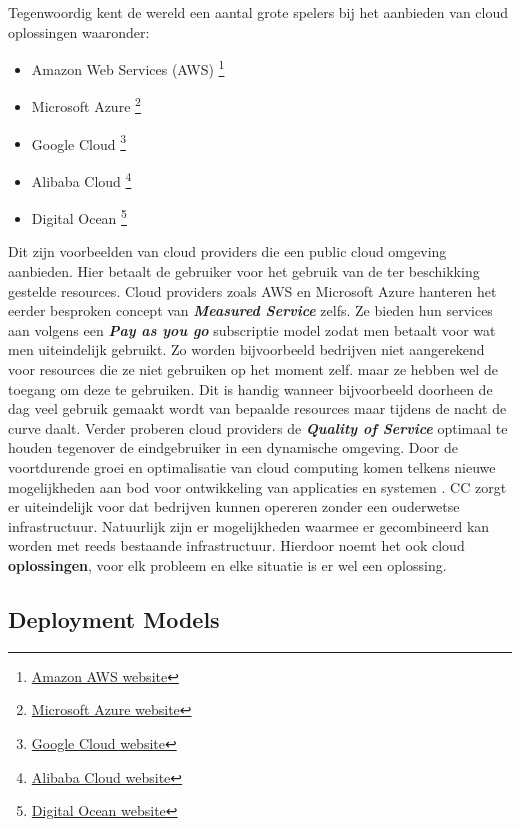 Tegenwoordig kent de wereld een aantal grote spelers bij het aanbieden van cloud oplossingen waaronder:

\begin{itemize}
    \item Amazon Web Services (AWS) \footnote{\href{https://aws.amazon.com/}{Amazon AWS website}}
    \item Microsoft Azure \footnote{\href{https://azure.microsoft.com/nl-nl/}{Microsoft Azure website}}
    \item Google Cloud \footnote{\href{https://cloud.google.com/}{Google Cloud website}}
    \item Alibaba Cloud \footnote{\href{https://eu.alibabacloud.com/en}{Alibaba Cloud website}}
    \item Digital Ocean \footnote{\href{https://www.digitalocean.com/}{Digital Ocean website}}
\end{itemize}

 Dit zijn voorbeelden van cloud providers die een public cloud omgeving aanbieden. Hier betaalt de gebruiker voor het gebruik van de ter beschikking gestelde resources. Cloud providers zoals AWS en Microsoft Azure hanteren het eerder besproken concept van \textbf{\textit{Measured Service}} zelfs. Ze bieden hun services aan volgens een \textbf{\textit{Pay as you go}} subscriptie model zodat men betaalt voor wat men uiteindelijk gebruikt. Zo worden bijvoorbeeld bedrijven niet aangerekend voor resources die ze niet gebruiken op het moment zelf. maar ze hebben wel de toegang om deze te gebruiken. Dit is handig wanneer bijvoorbeeld doorheen de dag veel gebruik gemaakt wordt van bepaalde resources maar tijdens de nacht de curve daalt. Verder proberen cloud providers de \textbf{\textit{Quality of Service}} optimaal te houden tegenover de eindgebruiker in een dynamische omgeving. Door de voortdurende groei en optimalisatie van cloud computing komen telkens nieuwe mogelijkheden aan bod voor ontwikkeling van applicaties en systemen \autocite{mell2011nist}. CC zorgt er uiteindelijk voor dat bedrijven kunnen opereren zonder een ouderwetse infrastructuur. Natuurlijk zijn er mogelijkheden waarmee er gecombineerd kan worden met reeds bestaande infrastructuur. Hierdoor noemt het ook cloud \textbf{oplossingen}, voor elk probleem en elke situatie is er wel een oplossing.
\newpage

\subsection{Deployment Models}
\label{sec:Deployment models}

